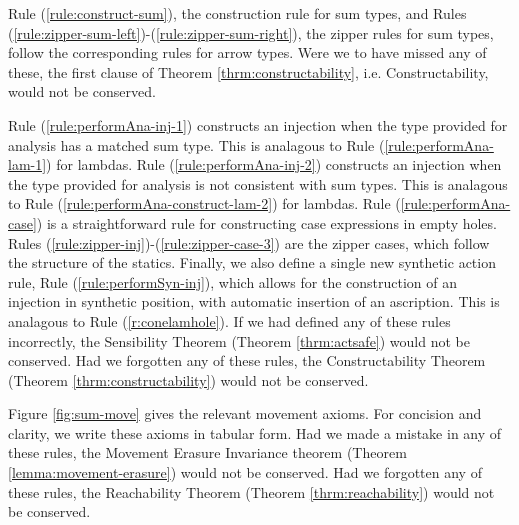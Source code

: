 Rule (\ref{rule:construct-sum}), the construction rule for sum types, and Rules (\ref{rule:zipper-sum-left})-(\ref{rule:zipper-sum-right}), the zipper rules for sum types, follow the corresponding rules for arrow types. Were we to have missed any of these, the first clause of Theorem \ref{thrm:constructability},  i.e. Constructability, would not be conserved.

Rule (\ref{rule:performAna-inj-1}) constructs an injection when the type provided for analysis has a matched sum type. This is analagous to Rule (\ref{rule:performAna-lam-1}) for lambdas. Rule (\ref{rule:performAna-inj-2}) constructs an injection when the type provided for analysis is not consistent with sum types. This is analagous to Rule (\ref{rule:performAna-construct-lam-2}) for lambdas. Rule (\ref{rule:performAna-case}) is a straightforward rule for constructing case expressions in empty holes. Rules (\ref{rule:zipper-inj})-(\ref{rule:zipper-case-3}) are the zipper cases, which follow the structure of the statics. Finally, we also define a single new synthetic action rule, Rule (\ref{rule:performSyn-inj}), which allows for the construction of an injection in synthetic position, with automatic insertion of an ascription. This is analagous to Rule (\ref{r:conelamhole}). If we had defined any of these rules incorrectly, the Sensibility Theorem (Theorem \ref{thrm:actsafe}) would not be conserved. Had we forgotten any of these rules, the Constructability Theorem (Theorem \ref{thrm:constructability}) would not be conserved.

Figure \ref{fig:sum-move} gives the relevant movement axioms. For concision and clarity, we write these axioms in tabular form. Had we made a mistake in any of these rules, the Movement Erasure Invariance theorem (Theorem \ref{lemma:movement-erasure}) would not be conserved. Had we forgotten any of these rules, the Reachability Theorem (Theorem \ref{thrm:reachability}) would not be conserved.

